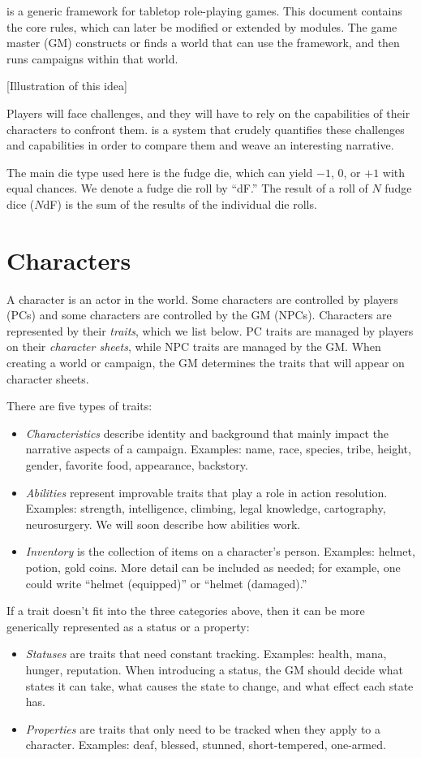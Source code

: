 \peupfudge{} is a generic framework for tabletop role-playing games.
This document contains the core rules, which can later be modified or extended by modules.
The game master (GM) constructs or finds a world that can use the \peupfudge{} framework,
and then runs campaigns within that world. 

[Illustration of this idea]

Players will face challenges, and they will have to rely on the capabilities of their characters to confront them.
\peupfudge{} is a system that crudely quantifies these challenges and capabilities in order to compare them and weave an interesting narrative.

The main die type used here is the fudge die, which can yield $-1$, $0$, or $+1$ with equal chances.
We denote a fudge die roll by ``dF.'' The result of a roll of $N$ fudge dice ($N$dF) is the sum of the results of the individual die rolls.

\section{Characters}
A character is an actor in the world.
Some characters are controlled by players (PCs) and some characters are controlled by the GM (NPCs).
Characters are represented by their \emph{traits}, which we list below.
PC traits are managed by players on their \emph{character sheets}, while NPC traits are managed by the GM.
When creating a world or campaign, the GM determines the traits that will appear on character sheets.

There are five types of traits:
\begin{itemize}
\item
\emph{Characteristics} describe identity and background that mainly impact the narrative aspects of a campaign.
Examples: name, race, species, tribe, height, gender, favorite food, appearance, backstory.
\item
\emph{Abilities} represent improvable traits that play a role in action resolution.
Examples: strength, intelligence, climbing, legal knowledge, cartography, neurosurgery.
We will soon describe how abilities work.
\item
\emph{Inventory} is the collection of items on a character’s person.
Examples: helmet, potion, gold coins.
More detail can be included as needed; for example, one could write ``helmet (equipped)'' or ``helmet (damaged).''
\end{itemize}
If a trait doesn’t fit into the three categories above, then it can be more generically represented as a status or a property:
\begin{itemize}
\item
\emph{Statuses} are traits that need constant tracking.
Examples: health, mana, hunger, reputation.
When introducing a status, the GM should decide what states it can take, what causes the state to change, and what effect each state has.
\item
\emph{Properties} are traits that only need to be tracked when they apply to a character.
Examples: deaf, blessed, stunned, short-tempered, one-armed.
\end{itemize}

